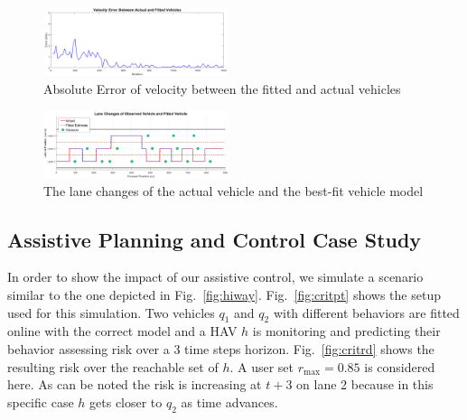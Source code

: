 \documentclass[letterpaper, 10 pt, conference]{ieeeconf}  %
\begin{document}
\begin{figure}[ht!]
    \includegraphics[width=0.48\textwidth]{fig/fiterroravg.png}
    \vspace{-5pt}
    \caption{Absolute Error of velocity between the fitted and actual vehicles} \label{fig:fwd}
\end{figure}
\begin{figure}[ht!]
    \includegraphics[width=0.48\textwidth]{fig/lanefit.png}
     \vspace{-5pt}
    \caption{The lane changes of the actual vehicle and the best-fit vehicle model} \label{fig:lanchan}
    	     \vspace{-10pt}
\end{figure}


\subsection{Assistive Planning and Control Case Study}
In order to show the impact of our assistive control, we simulate a scenario similar to the one depicted in Fig.~\ref{fig:hiway}. 
Fig.~\ref{fig:critpt} shows the setup used for this simulation. Two vehicles $q_1$ and $q_2$ with different behaviors are fitted online with the correct model and a HAV $h$ is monitoring and predicting their behavior assessing risk over a 3 time steps horizon. 
Fig.~\ref{fig:critrd} shows the resulting risk over the reachable set of $h$. A user set $r_{\max} = 0.85$ is considered here. As can be noted the risk is increasing at $t+3$ on lane 2 because in this specific case $h$ gets closer to $q_2$ as time advances. 
\end{document}
